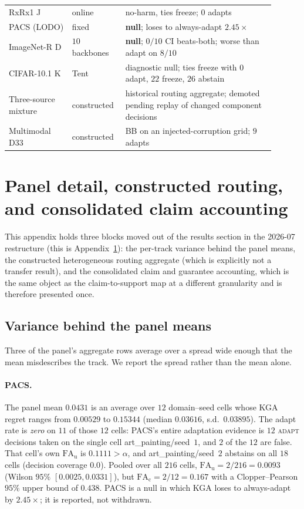 \begin{table}[t]
\begin{tabular}{@{}p{0.22\linewidth}p{0.16\linewidth}p{0.52\linewidth}@{}}
RxRx1 J & online & no-harm, ties freeze; $0$ adapts \\
PACS (LODO) & fixed & \textbf{null}; loses to always-adapt $2.45\times$ \\
ImageNet-R D & $10$ backbones & \textbf{null}; $0/10$ CI beats-both; worse than adapt on $8/10$ \\
CIFAR-10.1 K & Tent & diagnostic null; ties freeze with $0$ adapt, $22$ freeze, $26$ abstain \\
Three-source mixture & constructed & historical routing aggregate; demoted pending replay of changed component decisions \\
Multimodal D33 & constructed & BB on an injected-corruption grid; $9$ adapts \\
\bottomrule
\end{tabular}
\end{table}

\section{Panel detail, constructed routing, and consolidated claim
accounting}\label{app:panel-detail}
This appendix holds three blocks moved out of the results section in the 2026-07
restructure (this is Appendix~\ref{app:panel-detail}): the per-track variance behind the panel means, the constructed heterogeneous
routing aggregate (which is explicitly not a transfer result), and the consolidated claim and
guarantee accounting, which is the same object as the claim-to-support map at a different
granularity and is therefore presented once.

\subsection{Variance behind the panel means}\label{sec:panel-variance}
Three of the panel's aggregate rows average over a spread wide enough that the mean misdescribes the
track. We report the spread rather than the mean alone.

\paragraph{PACS.} The panel mean $0.0431$ is an average over $12$ domain--seed cells whose \textsc{KGA}
regret ranges from $0.00529$ to $0.15344$ (median $0.03616$, s.d.\ $0.03895$). The adapt rate is
\emph{zero} on $11$ of those $12$ cells: PACS's entire adaptation evidence is $12$ \textsc{adapt}
decisions taken on the single cell art\_painting/seed~$1$, and $2$ of the $12$ are false. That cell's
own $\mathrm{FA}_{\mathrm u}$ is $0.1111>\alpha$, and art\_painting/seed~$2$ abstains on all $18$
cells (decision coverage $0.0$). Pooled over all $216$ cells, $\mathrm{FA}_{\mathrm u}=2/216=0.0093$
(Wilson $95\%$ $[0.0025,0.0331]$), but $\mathrm{FA}_{\mathrm c}=2/12=0.167$ with a Clopper--Pearson
$95\%$ upper bound of $0.438$. PACS is a null in which \textsc{KGA} loses to always-adapt by
$2.45\times$; it is reported, not withdrawn.

